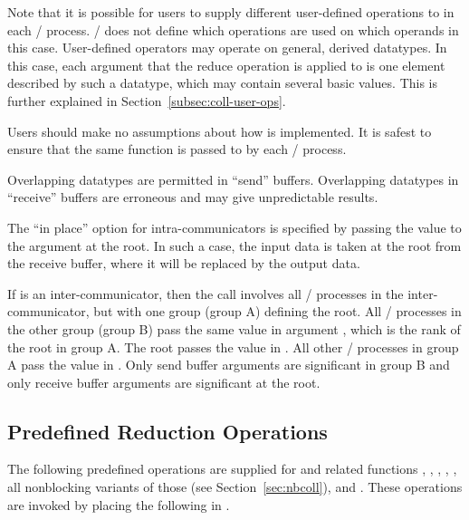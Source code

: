 Note that it is possible for users to supply different user-defined operations
to  in each \MPI/ process.  \MPI/ does not define which
operations are used on which operands in this case.
User-defined operators may operate on general, derived datatypes.
In this case, each argument that
the reduce operation is applied to is one element described by such a datatype,
which may contain several basic values.
This is further explained in Section~\ref{subsec:coll-user-ops}.
\begin{users}
  Users should make no assumptions about how  is
  implemented.  It is safest to ensure that the same function is passed to
   by each \MPI/ process.
\end{users}

Overlapping datatypes are permitted in ``send'' buffers.
Overlapping datatypes in ``receive'' buffers are erroneous
and may give unpredictable results.

The ``in place'' option  for intra-communicators is specified by passing the
value
 to the argument  at the root.
In such a case, the input data is taken at the root from the receive buffer,
where it will be replaced by the output data.


If  is an inter-communicator, then the call involves all
\MPI/ processes in the inter-communicator, but with one group (group A) defining the
root.  All \MPI/ processes in the other group (group B) pass the same value
in argument
, which is the rank of the root in group A.  The root
passes the value  in .
All other \MPI/ processes in group A pass the value  in
.
Only send buffer arguments are significant in group B and only receive
buffer arguments are significant at the root.

\subsection{Predefined Reduction Operations}
\label{coll-predefined-op}

The following predefined operations are supplied for 
and related functions ,
, ,
,
, all
nonblocking variants of those (see Section~\ref{sec:nbcoll}), and
.  These operations are invoked by placing
the following in .

